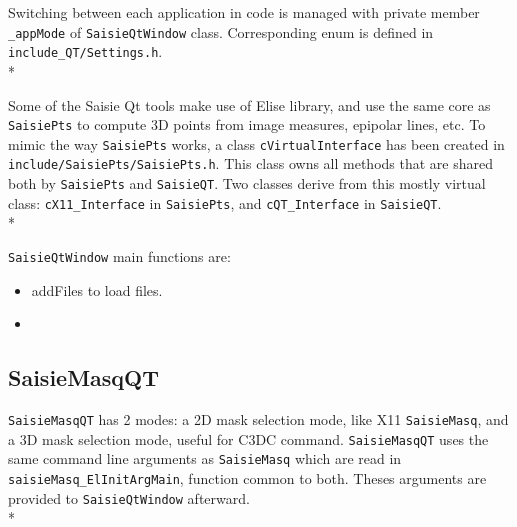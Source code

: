 \documentclass[a4paper]{book}
\begin{document}
Switching between each application in code is managed with private member {\tt \_appMode} of {\tt SaisieQtWindow} class. Corresponding enum is defined in {\tt include\_QT/Settings.h}.\\*

Some of the Saisie Qt tools make use of Elise library, and use the same core as {\tt SaisiePts} to compute 3D points from image measures, epipolar lines, etc. To mimic the way {\tt SaisiePts} works, a class {\tt cVirtualInterface} has been created in {\tt include/SaisiePts/SaisiePts.h}. This class owns all methods that are shared both by {\tt SaisiePts} and {\tt SaisieQT}. Two classes derive from this mostly virtual class: {\tt cX11\_Interface} in {\tt SaisiePts}, and {\tt cQT\_Interface} in {\tt SaisieQT}.\\*

{\tt SaisieQtWindow} main functions are: 
\begin{itemize}
\item addFiles to load files.
\item
\end{itemize}

\subsection{SaisieMasqQT}

{\tt SaisieMasqQT} has 2 modes: a 2D mask selection mode, like X11 {\tt SaisieMasq}, and a 3D mask selection mode, useful for C3DC command. {\tt SaisieMasqQT} uses the same command line arguments as {\tt SaisieMasq} which are read in {\tt saisieMasq\_ElInitArgMain}, function common to both. Theses arguments are provided to {\tt SaisieQtWindow} afterward.\\*
\end{document}
